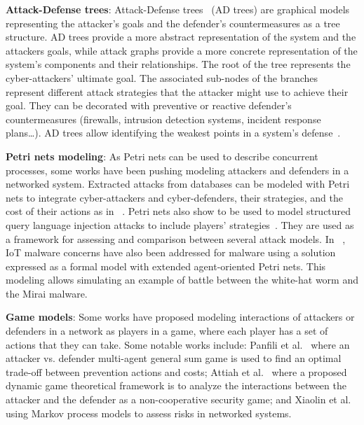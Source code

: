 \documentclass[conference]{IEEEtran}
\begin{document}


\noindent
\textbf{Attack-Defense trees}: \quad Attack-Defense trees~\cite{BKordy2010} (AD trees) are graphical models representing the attacker's goals and the defender's countermeasures as a tree structure. AD trees provide a more abstract representation of the system and the attackers goals, while attack graphs provide a more concrete representation of the system's components and their relationships. The root of the tree represents the cyber-attackers' ultimate goal. The associated sub-nodes of the branches represent different attack strategies that the attacker might use to achieve their goal. They can be decorated with preventive or reactive defender's countermeasures (firewalls, intrusion detection systems, incident response plans\dots).
AD trees allow identifying the weakest points in a system's defense~\cite{BKordy2010}.


\noindent
\textbf{Petri nets modeling}: \quad As Petri nets can be used to describe concurrent processes, some works have been pushing modeling attackers and defenders in a networked system.
Extracted attacks from databases can be modeled with Petri nets to integrate cyber-attackers and cyber-defenders, their strategies, and the cost of their actions as in ~\cite{MPetty2022}. Petri nets also show to be used to model structured query language injection attacks to include players' strategies~\cite{JBland2020}.
They are used as a framework for assessing and comparison between several attack models.
In ~\cite{SYamaguchi2020}, IoT malware concerns have also been addressed for  malware using a  solution expressed as a formal model with extended agent-oriented Petri nets. This modeling allows simulating an example of battle between the white-hat worm and the Mirai malware.


\noindent
\textbf{Game models}: \quad Some works have proposed modeling interactions of attackers or defenders in a network as players in a game, where each player has a set of actions that they can take.
Some notable works include: Panfili et al.~\cite{MPanfili2018} where an attacker vs. defender multi-agent general sum game is used to find an optimal trade-off between prevention actions and costs; Attiah et al.~\cite{AAttiah2018} where a proposed dynamic game theoretical framework is to analyze the interactions between the attacker and the defender as a non-cooperative security game; and Xiaolin et al.~\cite{CXiaolin2008} using Markov process models to assess risks in networked systems.
\end{document}

